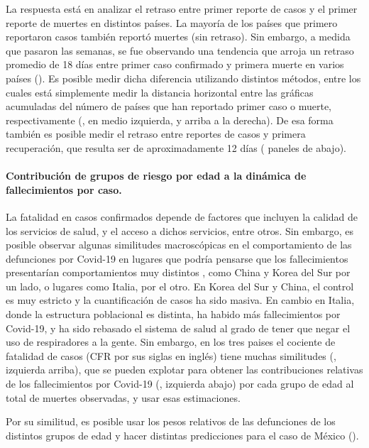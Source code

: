 La respuesta está en analizar el retraso entre primer reporte de casos y el primer reporte de muertes en distintos países. La mayoría de los países que primero reportaron casos también reportó muertes (sin retraso). Sin embargo, a medida que pasaron las semanas, se fue observando una tendencia que arroja un retraso promedio de 18 días entre primer caso confirmado y primera muerte en varios países (). Es posible medir dicha diferencia utilizando distintos métodos, entre los cuales está simplemente medir la distancia horizontal entre las gráficas acumuladas del número de países que han reportado primer caso o muerte, respectivamente (, en medio izquierda, y arriba a la derecha). 
De esa forma también es posible medir el retraso entre reportes de casos y primera recuperación, que resulta ser de aproximadamente 12 días  ( paneles de abajo).

\bigskip
\paragraph{Contribución de grupos de riesgo por edad a la dinámica de fallecimientos por caso.}
La fatalidad en casos confirmados depende de factores que incluyen la calidad de los servicios de salud, y el acceso a dichos servicios, entre otros. 
Sin embargo, es posible observar algunas similitudes macroscópicas en el comportamiento de las defunciones por Covid-19 en lugares que podría pensarse que los fallecimientos presentarían comportamientos muy distintos , como China y Korea del Sur por un lado, o lugares como Italia, por el otro. 
En Korea del Sur y China, el control es muy estricto y la cuantificación de casos ha sido masiva. 
En cambio en Italia, donde la estructura poblacional es distinta, ha habido más fallecimientos por Covid-19, y ha sido rebasado el sistema de salud al grado de tener que negar el uso de respiradores a la gente. 
Sin embargo, en los tres paises el cociente de fatalidad de casos (CFR por sus siglas en inglés) tiene muchas similitudes (, izquierda arriba), que se pueden explotar para obtener las contribuciones relativas de los fallecimientos por Covid-19 (, izquierda abajo) por cada grupo de edad al total de muertes observadas, y usar esas estimaciones. 

Por su similitud, es posible usar los pesos relativos de las defunciones de los distintos grupos de edad y  hacer distintas predicciones para el caso de México ().


